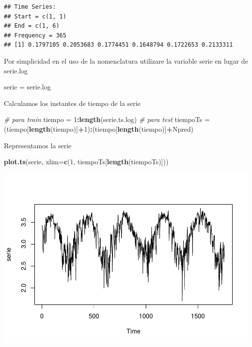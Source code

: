 \documentclass[]{article}
\newenvironment{Shaded}{\begin{snugshade}}{\end{snugshade}}
\newcommand{\KeywordTok}[1]{\textcolor[rgb]{0.13,0.29,0.53}{\textbf{#1}}}
\newcommand{\DataTypeTok}[1]{\textcolor[rgb]{0.13,0.29,0.53}{#1}}
\newcommand{\DecValTok}[1]{\textcolor[rgb]{0.00,0.00,0.81}{#1}}
\newcommand{\StringTok}[1]{\textcolor[rgb]{0.31,0.60,0.02}{#1}}
\newcommand{\CommentTok}[1]{\textcolor[rgb]{0.56,0.35,0.01}{\textit{#1}}}
\newcommand{\OperatorTok}[1]{\textcolor[rgb]{0.81,0.36,0.00}{\textbf{#1}}}
\newcommand{\NormalTok}[1]{#1}
\begin{document}
\begin{verbatim}
## Time Series:
## Start = c(1, 1) 
## End = c(1, 6) 
## Frequency = 365 
## [1] 0.1797105 0.2053683 0.1774451 0.1648794 0.1722653 0.2133311
\end{verbatim}

Por simplicidad en el uso de la nomenclatura utilizare la variable serie
en lugar de serie.log

\begin{Shaded}
\begin{Highlighting}[]
\NormalTok{serie =}\StringTok{ }\NormalTok{serie.log}
\end{Highlighting}
\end{Shaded}

Calculamos los instantes de tiempo de la serie

\begin{Shaded}
\begin{Highlighting}[]
\CommentTok{# para train}
\NormalTok{tiempo =}\StringTok{ }\DecValTok{1}\OperatorTok{:}\KeywordTok{length}\NormalTok{(serie.ts.log)}
\CommentTok{# para test}
\NormalTok{tiempoTs =}\StringTok{ }\NormalTok{(tiempo[}\KeywordTok{length}\NormalTok{(tiempo)]}\OperatorTok{+}\DecValTok{1}\NormalTok{)}\OperatorTok{:}\NormalTok{(tiempo[}\KeywordTok{length}\NormalTok{(tiempo)]}\OperatorTok{+}\NormalTok{Npred)}
\end{Highlighting}
\end{Shaded}

Representamos la serie

\begin{Shaded}
\begin{Highlighting}[]
\KeywordTok{plot.ts}\NormalTok{(serie, }\DataTypeTok{xlim=}\KeywordTok{c}\NormalTok{(}\DecValTok{1}\NormalTok{, tiempoTs[}\KeywordTok{length}\NormalTok{(tiempoTs)]))}
\end{Highlighting}
\end{Shaded}

\includegraphics{timeSeries_files/figure-latex/unnamed-chunk-44-1.pdf}
\end{document}
